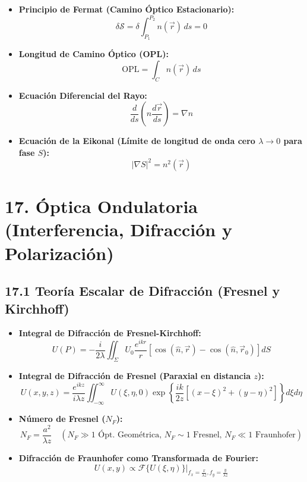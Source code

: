\documentclass[11pt,a4paper]{article}
\begin{document}
\begin{itemize}
  \item \textbf{Principio de Fermat (Camino Óptico Estacionario):}
  \[
    \delta \mathcal{S} = \delta \int_{P_1}^{P_2} n(\vec{r}) \, ds = 0
  \]
  \item \textbf{Longitud de Camino Óptico (OPL):}
  \[
    \mathrm{OPL} = \int_C n(\vec{r}) \, ds
  \]
  \item \textbf{Ecuación Diferencial del Rayo:}
  \[
    \frac{d}{ds}\left( n \frac{d\vec{r}}{ds} \right) = \nabla n
  \]
  \item \textbf{Ecuación de la Eikonal (Límite de longitud de onda cero $\lambda \to 0$ para fase $S$):}
  \[
    |\nabla S|^2 = n^2(\vec{r})
  \]
\end{itemize}

\section*{17. Óptica Ondulatoria (Interferencia, Difracción y Polarización)}

\subsection*{17.1 Teoría Escalar de Difracción (Fresnel y Kirchhoff)}

\begin{itemize}
  \item \textbf{Integral de Difracción de Fresnel-Kirchhoff:}
  \[
    U(P) = -\frac{i}{2\lambda} \iint_{\Sigma} U_0 \frac{e^{i k r}}{r} [\cos(\hat{n}, \vec{r}) - \cos(\hat{n}, \vec{r}_0)] dS
  \]
  \item \textbf{Integral de Difracción de Fresnel (Paraxial en distancia $z$):}
  \[
    U(x, y, z) = \frac{e^{i k z}}{i \lambda z} \iint_{-\infty}^{\infty} U(\xi, \eta, 0) \exp\left\{ \frac{i k}{2z}\left[ (x - \xi)^2 + (y - \eta)^2 \right] \right\} d\xi d\eta
  \]
  \item \textbf{Número de Fresnel ($N_F$):}
  \[
    N_F = \frac{a^2}{\lambda z} \quad (N_F \gg 1 \text{ Ópt. Geométrica}, \, N_F \sim 1 \text{ Fresnel}, \, N_F \ll 1 \text{ Fraunhofer})
  \]
  \item \textbf{Difracción de Fraunhofer como Transformada de Fourier:}
  \[
    U(x, y) \propto \mathcal{F}\{U(\xi, \eta)\}\Big|_{f_x = \frac{x}{\lambda z}, f_y = \frac{y}{\lambda z}}
  \]
\end{itemize}
\end{document}
